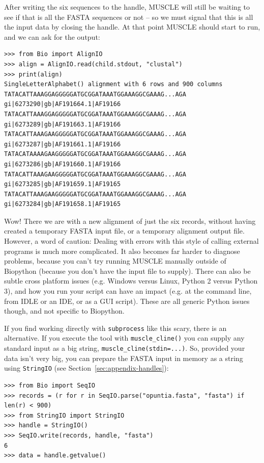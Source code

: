 \documentclass{report}
\begin{document}
After writing the six sequences to the handle, MUSCLE will still be waiting
to see if that is all the FASTA sequences or not -- so we must signal that
this is all the input data by closing the handle. At that point MUSCLE should
start to run, and we can ask for the output:

\begin{verbatim}
>>> from Bio import AlignIO
>>> align = AlignIO.read(child.stdout, "clustal")
>>> print(align)
SingleLetterAlphabet() alignment with 6 rows and 900 columns
TATACATTAAAGGAGGGGGATGCGGATAAATGGAAAGGCGAAAG...AGA gi|6273290|gb|AF191664.1|AF19166
TATACATTAAAGGAGGGGGATGCGGATAAATGGAAAGGCGAAAG...AGA gi|6273289|gb|AF191663.1|AF19166
TATACATTAAAGAAGGGGGATGCGGATAAATGGAAAGGCGAAAG...AGA gi|6273287|gb|AF191661.1|AF19166
TATACATAAAAGAAGGGGGATGCGGATAAATGGAAAGGCGAAAG...AGA gi|6273286|gb|AF191660.1|AF19166
TATACATTAAAGAAGGGGGATGCGGATAAATGGAAAGGCGAAAG...AGA gi|6273285|gb|AF191659.1|AF19165
TATACATTAAAGAAGGGGGATGCGGATAAATGGAAAGGCGAAAG...AGA gi|6273284|gb|AF191658.1|AF19165
\end{verbatim}

Wow! There we are with a new alignment of just the six records, without having created
a temporary FASTA input file, or a temporary alignment output file. However, a word of
caution: Dealing with errors with this style of calling external programs is much more
complicated.
It also becomes far harder to diagnose problems, because you can't try running MUSCLE
manually outside of Biopython (because you don't have the input file to supply).
There can also be subtle cross platform issues (e.g. Windows versus Linux,
Python 2 versus Python 3), and how
you run your script can have an impact (e.g. at the command line, from IDLE or an
IDE, or as a GUI script). These are all generic Python issues though, and not
specific to Biopython.

If you find working directly with \texttt{subprocess} like this scary, there is an
alternative. If you execute the tool with \texttt{muscle\_cline()} you can supply
any standard input as a big string, \texttt{muscle\_cline(stdin=...)}. So,
provided your data isn't very big, you can prepare the FASTA input in memory as
a string using \texttt{StringIO} (see Section~\ref{sec:appendix-handles}):

\begin{verbatim}
>>> from Bio import SeqIO
>>> records = (r for r in SeqIO.parse("opuntia.fasta", "fasta") if len(r) < 900)
>>> from StringIO import StringIO
>>> handle = StringIO()
>>> SeqIO.write(records, handle, "fasta")
6
>>> data = handle.getvalue()
\end{verbatim}
\end{document}
